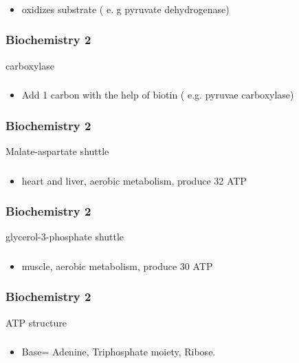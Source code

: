 \documentclass[11pt]{beamer}
\begin{document}
\begin{frame}
 \frametitle{}
\begin{itemize}
\item oxidizes substrate ( e. g pyruvate dehydrogenase) 
\end{itemize}
\end{frame}

\begin{frame}
 \frametitle{Biochemistry 2}
carboxylase 
\end{frame}

\begin{frame}
 \frametitle{}
\begin{itemize}
\item Add 1 carbon with the help of biotin ( e.g. pyruvae carboxylase) 
\end{itemize}
\end{frame}

\begin{frame}
 \frametitle{Biochemistry 2}
Malate-aspartate shuttle 
\end{frame}

\begin{frame}
 \frametitle{}
\begin{itemize}
\item heart and liver, aerobic metabolism, produce 32 ATP 
\end{itemize}
\end{frame}

\begin{frame}
 \frametitle{Biochemistry 2}
glycerol-3-phosphate shuttle
\end{frame}

\begin{frame}
 \frametitle{}
\begin{itemize}
\item muscle, aerobic metabolism, produce 30 ATP 
\end{itemize}
\end{frame}

\begin{frame}
 \frametitle{Biochemistry 2}
ATP structure 
\end{frame}

\begin{frame}
 \frametitle{}
\begin{itemize}
\item Base= Adenine, Triphosphate moiety, Ribose. 
\end{itemize}
\end{frame}
\end{document}
